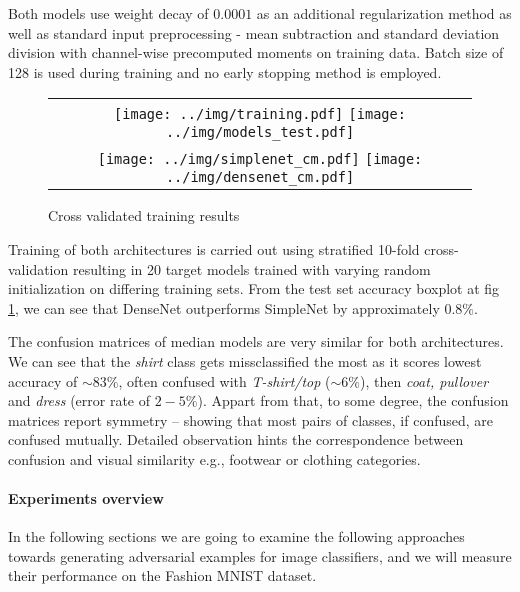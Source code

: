 Both models use weight decay of $0.0001$ as an additional regularization method as well as standard input preprocessing - mean subtraction and standard deviation division with channel-wise precomputed moments on training data. Batch size of 128 is used during training and no early stopping method is employed.

\begin{figure}
\centering
\begin{tabular}{@{}c@{}}
    \texttt{[image: ../img/training.pdf]}
    \texttt{[image: ../img/models\_test.pdf]} \\
    \texttt{[image: ../img/simplenet\_cm.pdf]}
    \texttt{[image: ../img/densenet\_cm.pdf]}  \\
\end{tabular}
\caption{Cross validated training results}
\label{fig:training}
\end{figure}

Training of both architectures is carried out using stratified 10-fold cross-validation resulting in 20 target models trained with varying random initialization on differing training sets. From the test set accuracy boxplot at fig \ref{fig:training}, we can see that DenseNet outperforms SimpleNet by approximately $0.8\%$.

The confusion matrices of median models are very similar for both architectures. We can see that the \emph{shirt} class gets missclassified the most as it scores lowest accuracy of $\sim 83\%$, often confused with \emph{T-shirt/top} ($\sim 6\%$), then \emph{coat, pullover} and \emph{dress} (error rate of $2-5\%$). Appart from that, to some degree, the confusion matrices report symmetry -- showing that most pairs of classes, if confused, are confused mutually. Detailed observation hints the correspondence between confusion and visual similarity e.g., footwear or clothing categories.

\paragraph{Experiments overview}

In the following sections we are going to examine the following approaches towards generating adversarial examples for image classifiers, and we will measure their performance on the Fashion MNIST dataset.

